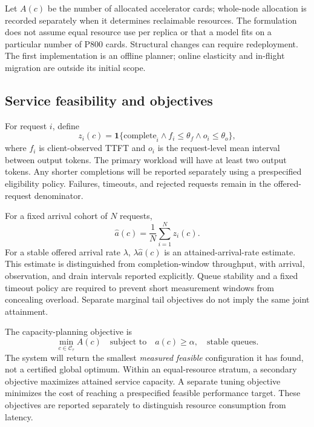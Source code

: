 \documentclass[11pt,a4paper]{article}
\begin{document}
Let $A(c)$ be the number of allocated accelerator cards; whole-node allocation is recorded separately when it determines reclaimable resources. The formulation does not assume equal resource use per replica or that a model fits on a particular number of P800 cards. Structural changes can require redeployment. The first implementation is an offline planner; online elasticity and in-flight migration are outside its initial scope.

\subsection{Service feasibility and objectives}
For request $i$, define
\begin{equation}
 z_i(c)=\mathbf{1}\{\text{complete}_i \land f_i\leq\theta_f
                  \land o_i\leq\theta_o\},
\end{equation}
where $f_i$ is client-observed TTFT and $o_i$ is the request-level mean interval between output tokens. The primary workload will have at least two output tokens. Any shorter completions will be reported separately using a prespecified eligibility policy. Failures, timeouts, and rejected requests remain in the offered-request denominator.

For a fixed arrival cohort of $N$ requests,
\begin{equation}
 \widehat a(c)=\frac{1}{N}\sum_{i=1}^{N}z_i(c).
\end{equation}
For a stable offered arrival rate $\lambda$, $\lambda\widehat a(c)$ is an attained-arrival-rate estimate. This estimate is distinguished from completion-window throughput, with arrival, observation, and drain intervals reported explicitly. Queue stability and a fixed timeout policy are required to prevent short measurement windows from concealing overload. Separate marginal tail objectives do not imply the same joint attainment.

The capacity-planning objective is
\begin{equation}
 \min_{c\in\mathcal{C}_{\tau}} A(c)
 \quad\text{subject to}\quad
 a(c)\geq\alpha,\quad\text{stable queues}.
 \label{eq:capacity}
\end{equation}
The system will return the smallest \emph{measured feasible} configuration it has found, not a certified global optimum. Within an equal-resource stratum, a secondary objective maximizes attained service capacity. A separate tuning objective minimizes the cost of reaching a prespecified feasible performance target. These objectives are reported separately to distinguish resource consumption from latency.
\end{document}
